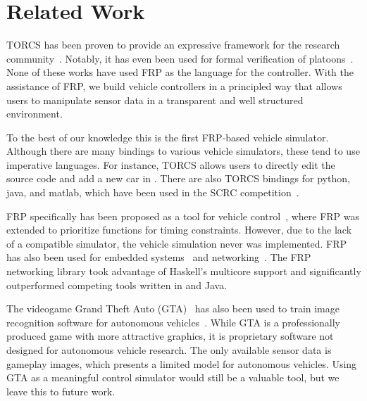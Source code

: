 \section{Related Work}

TORCS has been proven to provide an expressive framework for the research community~\cite{OnievaPAMP09,conf/cig/CardamoneLL09,conf/cig/MunozGS10}. 
Notably, it has even been used for formal verification of platoons~\cite{kamali2016formal,xu2016experimental}. 
None of these works have used FRP as the language for the controller.
With the assistance of FRP, we build vehicle controllers in a principled way that allows users to manipulate sensor data in a transparent and well structured environment.

To the best of our knowledge this is the first FRP-based vehicle simulator.
Although there are many bindings to various vehicle simulators, these tend to use imperative languages.
For instance, TORCS allows users to directly edit the source code and add a new car in \CC.
There are also TORCS bindings for python, java, and matlab, which have been used in the SCRC competition~\cite{SCRC}.

FRP specifically has been proposed as a tool for vehicle control~\cite{kazemi2016,zou2016}, where FRP was extended to prioritize functions for timing constraints. However, due to the lack of a compatible simulator, the vehicle simulation never was implemented. 
FRP has also been used for embedded systems~\cite{helbling2016juniper} and networking~\cite{voellmy2012scalable}.
The FRP networking library took advantage of Haskell's multicore support and significantly outperformed competing tools written in \CC and Java.

The videogame Grand Theft Auto (GTA)~\cite{gtaV} has also been used to train image recognition software for autonomous vehicles~\cite{gtaPrinceton}.
While GTA is a professionally produced game with more attractive graphics, it is proprietary software not designed for autonomous vehicle research.
The only available sensor data is gameplay images, which presents a limited model for autonomous vehicles.
Using GTA as a meaningful control simulator would still be a valuable tool, but we leave this to future work.
